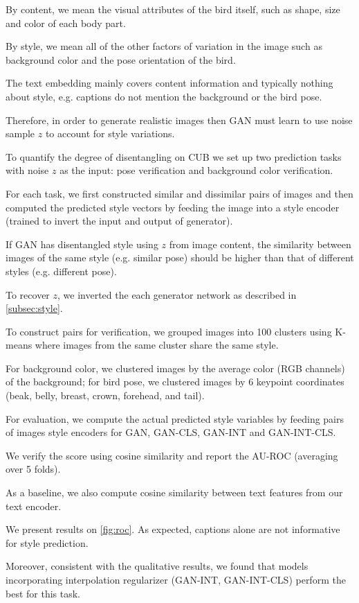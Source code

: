 By content, we mean the visual attributes of the bird itself, such as shape, size and color of each body part.

By style, we mean all of the other factors of variation in the image such as background color and the pose orientation of the bird.

The text embedding mainly covers content information and typically nothing about style, e.g. captions do not mention the background or the bird pose.

Therefore, in order to generate realistic images then GAN must learn to use noise sample $z$ to account for style variations. 

To quantify the degree of disentangling on CUB we set up two prediction tasks with noise $z$ as the input: pose verification and background color verification.

For each task, we first constructed similar and dissimilar pairs of images and then computed the predicted style vectors by feeding the image into a style encoder (trained to invert the input and output of generator).

If GAN has disentangled style using $z$ from image content, the similarity between images of the same style (e.g. similar pose) should be higher than that of different styles (e.g. different pose).

To recover $z$, we inverted the each generator network as described in \autoref{subsec:style}.

To construct pairs for verification, we grouped images into 100 clusters using K-means where images from the same cluster share the same style.

For background color, we clustered images by the average color (RGB channels) of the background; for bird pose, we clustered images by 6 keypoint coordinates (beak, belly, breast, crown, forehead, and tail).

For evaluation, we compute the actual predicted style variables by feeding pairs of images style encoders for GAN, GAN-CLS, GAN-INT and GAN-INT-CLS.

We verify the score using cosine similarity and report the AU-ROC (averaging over 5 folds).

As a baseline, we also compute cosine similarity between text features from our text encoder.

We present results on \autoref{fig:roc}. As expected, captions alone are not informative for style prediction.

Moreover, consistent with the qualitative results, we found that models incorporating interpolation regularizer (GAN-INT, GAN-INT-CLS) perform the best for this task. 

